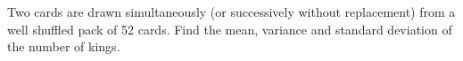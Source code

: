 \begin{flushleft}
Two cards are drawn simultaneously (or successively without replacement) from a well
shuffled pack of 52 cards. Find the mean, variance and standard deviation of the number
of kings.
\end{flushleft}